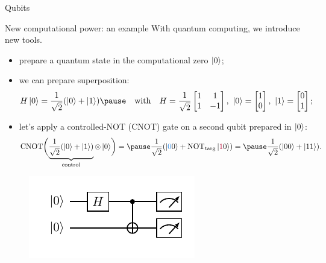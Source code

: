 \documentclass[8pt, xcolor={svgnames}, hyperref={linkcolor=black}]{beamer}
\begin{document}
\begin{frame}{Qubits}
\begin{figure}
        \end{figure}        
\end{frame}


\begin{frame}{New computational power: an example}
\pause
With quantum computing, we introduce new tools.
\pause
\begin{itemize}[noitemsep]
\item[\faRocket] prepare a quantum state in the computational zero $\ket{0}$;
\pause
\item[\faSliders] we can prepare superposition: 
$$H\ket{0} = \frac{1}{\sqrt{2}}(\ket{0} + \ket{1}) \pause \quad \text{with} \quad H = \frac{1}{\sqrt{2}}
\begin{bmatrix} 1 & 1 \\ 1 & -1 \end{bmatrix},\,\, \ket{0}=\begin{bmatrix} 1 \\ 0 
\end{bmatrix},\,\,\ket{1}=\begin{bmatrix} 0 \\ 1 \end{bmatrix};$$
\pause
\item[\faShareAlt] let's apply a controlled-NOT (CNOT) gate on a second qubit prepared in $\ket{0}$:
$$ \text{CNOT} \biggl( \underbrace{\frac{1}{\sqrt{2}}(\ket{0} + \ket{1})}_{\text{control}}\otimes 
\ket{0} \biggr) = \pause \frac{1}{\sqrt{2}}(\ket{\textcolor{bleudefrance}{0}0} + 
\text{NOT}_{\rm targ}\ket{\textcolor{brightmaroon}{1}0}) = \pause \frac{1}{\sqrt{2}}(\ket{00} + \ket{11}). $$
\end{itemize}
\pause
\begin{figure}
   \includegraphics[width=0.6\linewidth]{figures/baby3.pdf}
\end{figure}    
\end{frame}
\end{document}
